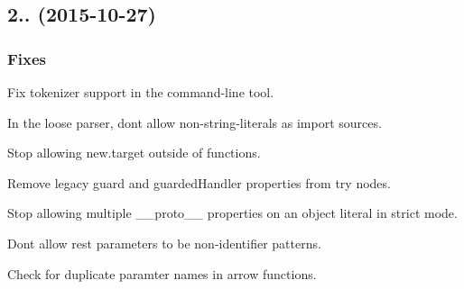 \subsection*{2.. (2015-\/10-\/27)}

\subsubsection*{Fixes}

Fix tokenizer support in the command-\/line tool.

In the loose parser, don\textquotesingle{}t allow non-\/string-\/literals as import sources.

Stop allowing {\ttfamily new.\+target} outside of functions.

Remove legacy {\ttfamily guard} and {\ttfamily guarded\+Handler} properties from try nodes.

Stop allowing multiple {\ttfamily \+\_\+\+\_\+proto\+\_\+\+\_\+} properties on an object literal in strict mode.

Don\textquotesingle{}t allow rest parameters to be non-\/identifier patterns.

Check for duplicate paramter names in arrow functions. 